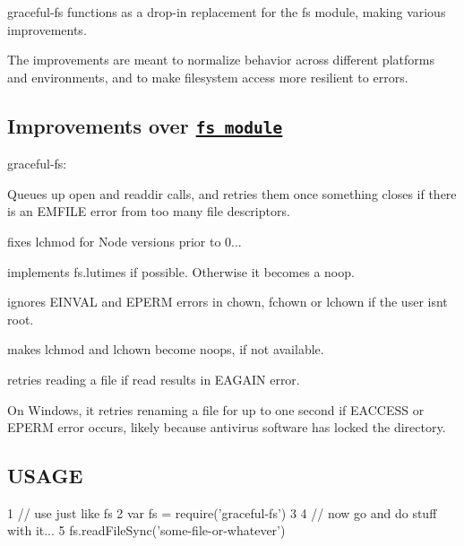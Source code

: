 graceful-\/fs functions as a drop-\/in replacement for the fs module, making various improvements.

The improvements are meant to normalize behavior across different platforms and environments, and to make filesystem access more resilient to errors.

\subsection*{Improvements over \href{http://api.nodejs.org/fs.html}{\tt fs module}}

graceful-\/fs\+:


\begin{DoxyItemize}
\item Queues up {\ttfamily open} and {\ttfamily readdir} calls, and retries them once something closes if there is an E\+M\+F\+I\+L\+E error from too many file descriptors.
\item fixes {\ttfamily lchmod} for Node versions prior to 0...
\item implements {\ttfamily fs.\+lutimes} if possible. Otherwise it becomes a noop.
\item ignores {\ttfamily E\+I\+N\+V\+A\+L} and {\ttfamily E\+P\+E\+R\+M} errors in {\ttfamily chown}, {\ttfamily fchown} or {\ttfamily lchown} if the user isn\textquotesingle{}t root.
\item makes {\ttfamily lchmod} and {\ttfamily lchown} become noops, if not available.
\item retries reading a file if {\ttfamily read} results in E\+A\+G\+A\+I\+N error.
\end{DoxyItemize}

On Windows, it retries renaming a file for up to one second if {\ttfamily E\+A\+C\+C\+E\+S\+S} or {\ttfamily E\+P\+E\+R\+M} error occurs, likely because antivirus software has locked the directory.

\subsection*{U\+S\+A\+G\+E}


\begin{DoxyCode}
1 // use just like fs
2 var fs = require('graceful-fs')
3 
4 // now go and do stuff with it...
5 fs.readFileSync('some-file-or-whatever')
\end{DoxyCode}
 